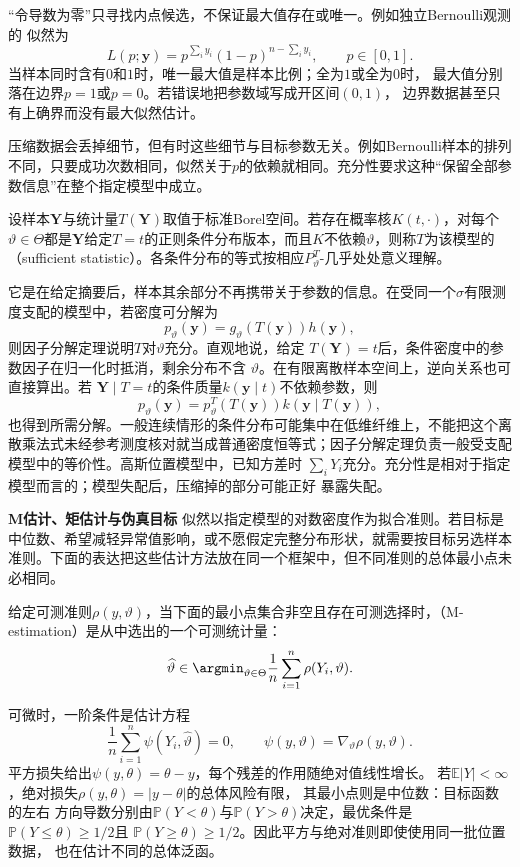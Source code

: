 “令导数为零”只寻找内点候选，不保证最大值存在或唯一。例如独立Bernoulli观测的
似然为
\[
  L(p;\bm y)=p^{\sum_i y_i}(1-p)^{n-\sum_i y_i},\qquad p\in[0,1].
\]
当样本同时含有\(0\)和\(1\)时，唯一最大值是样本比例；全为\(1\)或全为\(0\)时，
最大值分别落在边界\(p=1\)或\(p=0\)。若错误地把参数域写成开区间\((0,1)\)，
边界数据甚至只有上确界而没有最大似然估计。

压缩数据会丢掉细节，但有时这些细节与目标参数无关。例如Bernoulli样本的排列不同，只要成功次数相同，似然关于\(p\)的依赖就相同。充分性要求这种“保留全部参数信息”在整个指定模型中成立。
\begin{definition}[充分统计量]
  \label{def:statistics-sufficient-statistic}
  设样本\(\bm Y\)与统计量\(T(\bm Y)\)取值于标准Borel空间。若存在概率核\(K(t,\cdot)\)，对每个\(\vartheta\in\Theta\)都是\(\bm Y\)给定\(T=t\)的正则条件分布版本，而且\(K\)不依赖\(\vartheta\)，则称\(T\)为该模型的（sufficient statistic）。各条件分布的等式按相应\(P_\vartheta^T\)-几乎处处意义理解。
\end{definition}
它是在给定摘要后，样本其余部分不再携带关于参数的信息。在受同一个\(\sigma\)有限测度支配的模型中，若密度可分解为
\[
  p_\vartheta(\bm y)=g_\vartheta(T(\bm y))h(\bm y),
\]
则因子分解定理说明\(T\)对\(\vartheta\)充分。直观地说，给定
\(T(\bm Y)=t\)后，条件密度中的参数因子在归一化时抵消，剩余分布不含
\(\vartheta\)。在有限离散样本空间上，逆向关系也可直接算出。若
\(\bm Y\mid T=t\)的条件质量\(k(\bm y\mid t)\)不依赖参数，则
\[
  p_\vartheta(\bm y)
  =p_\vartheta^T(T(\bm y))k(\bm y\mid T(\bm y)),
\]
也得到所需分解。一般连续情形的条件分布可能集中在低维纤维上，不能把这个离散乘法式未经参考测度核对就当成普通密度恒等式；因子分解定理负责一般受支配模型中的等价性。高斯位置模型中，已知方差时
\(\sum_iY_i\)充分。充分性是相对于指定模型而言的；模型失配后，压缩掉的部分可能正好
暴露失配。

\par\medskip\noindent\textbf{M估计、矩估计与伪真目标}\quad
似然以指定模型的对数密度作为拟合准则。若目标是中位数、希望减轻异常值影响，或不愿假定完整分布形状，就需要按目标另选样本准则。下面的表达把这些估计方法放在同一个框架中，但不同准则的总体最小点未必相同。
\begin{definition}[M估计]
  \label{def:statistics-m-estimator}
给定可测准则\(\rho(y,\vartheta)\)，当下面的最小点集合非空且存在可测选择时，（M-estimation）是从中选出的一个可测统计量：
\[
  \widehat\vartheta
  \in\argmin_{\vartheta\in\Theta}
  \frac1n\sum_{i=1}^n\rho(Y_i,\vartheta).
\]
\end{definition}
可微时，一阶条件是估计方程
\[
  \frac1n\sum_{i=1}^n\psi(Y_i,\widehat\vartheta)=0,
  \qquad
  \psi(y,\vartheta)=\nabla_\vartheta\rho(y,\vartheta).
\]
平方损失给出\(\psi(y,\theta)=\theta-y\)，每个残差的作用随绝对值线性增长。
若\(\mathbb E|Y|<\infty\)，绝对损失\(\rho(y,\theta)=|y-\theta|\)的总体风险有限，
其最小点则是中位数：目标函数的左右
方向导数分别由\(\mathbb{P}(Y<\theta)\)与\(\mathbb{P}(Y>\theta)\)决定，最优条件是
\(\mathbb{P}(Y\leq\theta)\geq1/2\)且
\(\mathbb{P}(Y\geq\theta)\geq1/2\)。因此平方与绝对准则即使使用同一批位置数据，
也在估计不同的总体泛函。

